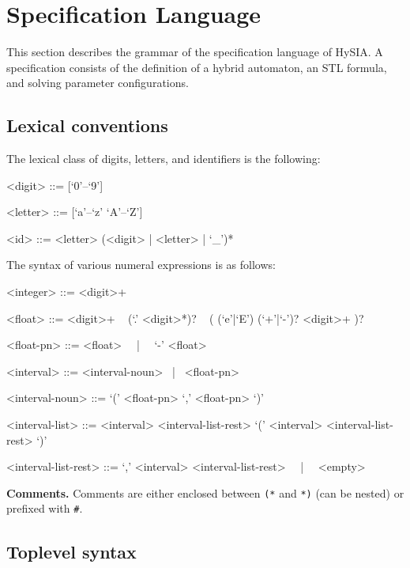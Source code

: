 \documentclass[10pt,a4paper]{article}
\begin{document}
\section{Specification Language}

This section describes the grammar of the specification language of HySIA.
A specification consists of the definition of a hybrid automaton, an STL formula, and solving parameter configurations.

\subsection{Lexical conventions}

The lexical class of digits, letters, and identifiers is the following:
\begin{grammar}
<digit> ::= [`0'--`9']

<letter> ::= [`a'--`z' `A'--`Z']

<id> ::= <letter> (<digit> | <letter> | `_')*
\end{grammar}

The syntax of various numeral expressions is as follows:
\begin{grammar}
<integer> ::= <digit>+

<float> ::= 
<digit>+ ~ (`.' <digit>*)? ~ ( (`e'|`E') (`+'|`-')? <digit>+ )?

<float-pn> ::= <float> ~~|~~ `-' <float>

<interval> ::= <interval-noun> ~|~ <float-pn>

<interval-noun> ::= `(' <float-pn> `,' <float-pn> `)'

<interval-list> ::= <interval> <interval-list-rest>
\alt `(' <interval> <interval-list-rest> `)'

<interval-list-rest> ::= `,' <interval> <interval-list-rest> ~~|~~ <empty>
\end{grammar}


\noindent
\textbf{Comments.}
Comments are either enclosed between \texttt{(*} and \texttt{*)} (can be nested) or prefixed with \texttt{\#}.


\subsection{Toplevel syntax}
\end{document}
